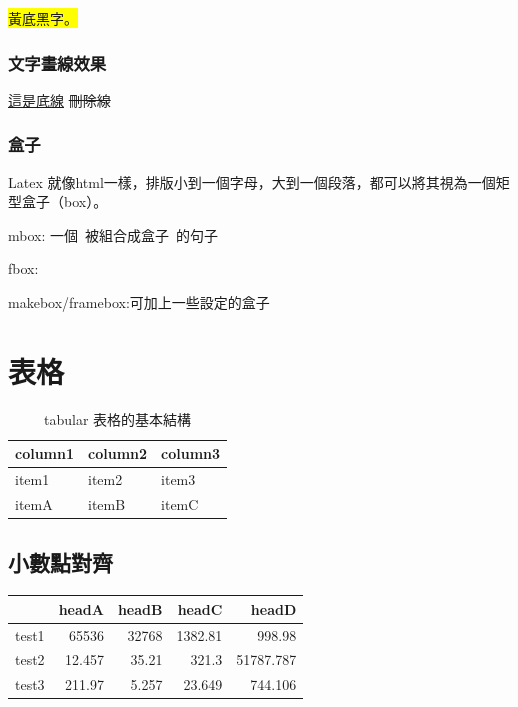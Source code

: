 \hbox{\colorbox{yellow}{黃底黑字。}}
\hbox{\color{blue}{藍色文字}}
\hbox{}
\hbox{\color{black}{最後請記得回復成預設黑色字體}}

\subsubsection{文字畫線效果}

\hbox{\uline{這是底線}}
\hbox{}
\hbox{}
\hbox{\sout{刪除線}}
\hbox{}

\subsubsection{盒子}
Latex 就像html一樣，排版小到一個字母，大到一個段落，都可以將其視為一個矩型盒子（box）。

mbox:
\mbox{一個 被組合成盒子 的句子}

fbox:

makebox/framebox:可加上一些設定的盒子

\hbox{}

\newpage


\section{表格}
\begin{table}[h]
   \centering
   \caption{tabular 表格的基本結構}\label{booktabs_1}
		\begin{tabular}[t]{lll}
		\hline
		column1 & column2 & column3 \\
		\hline
		item1   & item2   & item3 \\
		itemA   & itemB   & itemC \\
		\hline
		\end{tabular}
\end{table}

\subsection{小數點對齊}
\begin{tabular}{lD{.}{.}{3}D{.}{.}{3}D{.}{.}{3}D{.}{.}{3}}
   \toprule
         & headA & headB & headC & headD \\
   \midrule
   test1 & 65536  & 32768 & 1382.81 & 998.98 \\
   test2 & 12.457 & 35.21 & 321.3   & 51787.787 \\
   test3 & 211.97 & 5.257& 23.649 & 744.106 \\
   \bottomrule
\end{tabular}
\clearpage

